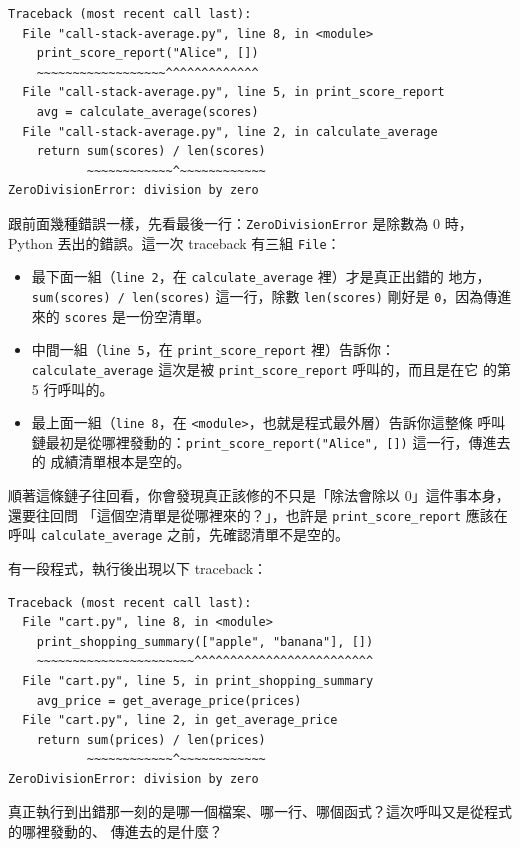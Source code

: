 \begin{verbatim}
Traceback (most recent call last):
  File "call-stack-average.py", line 8, in <module>
    print_score_report("Alice", [])
    ~~~~~~~~~~~~~~~~~~^^^^^^^^^^^^^
  File "call-stack-average.py", line 5, in print_score_report
    avg = calculate_average(scores)
  File "call-stack-average.py", line 2, in calculate_average
    return sum(scores) / len(scores)
           ~~~~~~~~~~~~^~~~~~~~~~~~~
ZeroDivisionError: division by zero
\end{verbatim}

跟前面幾種錯誤一樣，先看最後一行：\texttt{ZeroDivisionError} 是除數為 0 時，Python
丟出的錯誤。這一次 traceback 有三組 \texttt{File}：

\begin{itemize}
\item 最下面一組（\texttt{line 2}，在 \texttt{calculate\_average} 裡）才是真正出錯的
地方，\texttt{sum(scores) / len(scores)} 這一行，除數 \texttt{len(scores)} 剛好是
\texttt{0}，因為傳進來的 \texttt{scores} 是一份空清單。
\item 中間一組（\texttt{line 5}，在 \texttt{print\_score\_report} 裡）告訴你：
\texttt{calculate\_average} 這次是被 \texttt{print\_score\_report} 呼叫的，而且是在它
的第 5 行呼叫的。
\item 最上面一組（\texttt{line 8}，在 \texttt{<module>}，也就是程式最外層）告訴你這整條
呼叫鏈最初是從哪裡發動的：\texttt{print\_score\_report("Alice", [])} 這一行，傳進去的
成績清單根本是空的。
\end{itemize}

順著這條鏈子往回看，你會發現真正該修的不只是「除法會除以 0」這件事本身，還要往回問
「這個空清單是從哪裡來的？」，也許是 \texttt{print\_score\_report} 應該在呼叫
\texttt{calculate\_average} 之前，先確認清單不是空的。


\begin{drills}[label=drills:call-stack]
\item 有一段程式，執行後出現以下 traceback：
\begin{verbatim}
Traceback (most recent call last):
  File "cart.py", line 8, in <module>
    print_shopping_summary(["apple", "banana"], [])
    ~~~~~~~~~~~~~~~~~~~~~~^^^^^^^^^^^^^^^^^^^^^^^^^
  File "cart.py", line 5, in print_shopping_summary
    avg_price = get_average_price(prices)
  File "cart.py", line 2, in get_average_price
    return sum(prices) / len(prices)
           ~~~~~~~~~~~~^~~~~~~~~~~~~
ZeroDivisionError: division by zero
\end{verbatim}
真正執行到出錯那一刻的是哪一個檔案、哪一行、哪個函式？這次呼叫又是從程式的哪裡發動的、
傳進去的是什麼？
\end{drills}

